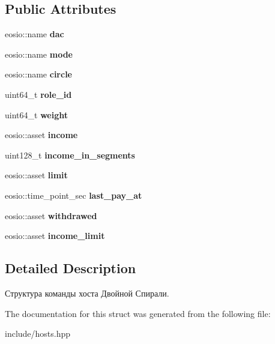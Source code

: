 \subsection*{Public Attributes}
\begin{DoxyCompactItemize}
\item 
\mbox{\label{structdacs_ae9be077b76903051cf3e9fbafe071bda}} 
eosio\+::name {\bfseries dac}
\item 
\mbox{\label{structdacs_a6b3d8acc4826f5b3d7c0ee75161490ac}} 
eosio\+::name {\bfseries mode}
\item 
\mbox{\label{structdacs_ab60ff845d44976364fa1c90a68fd8082}} 
eosio\+::name {\bfseries circle}
\item 
\mbox{\label{structdacs_ae88a910f895aae33d9cd222cbfa2888e}} 
uint64\+\_\+t {\bfseries role\+\_\+id}
\item 
\mbox{\label{structdacs_abd0b1806d25461cd48b36370bb6e7c09}} 
uint64\+\_\+t {\bfseries weight}
\item 
\mbox{\label{structdacs_a8127a0b285195817c1ddfed691d202cb}} 
eosio\+::asset {\bfseries income}
\item 
\mbox{\label{structdacs_a814ea7767e5b315cfc1f3328208e3aba}} 
uint128\+\_\+t {\bfseries income\+\_\+in\+\_\+segments}
\item 
\mbox{\label{structdacs_aeb6036192b4494082811b9e881d3bd92}} 
eosio\+::asset {\bfseries limit}
\item 
\mbox{\label{structdacs_abc7762bb445e20f54dc0d447cfc67bce}} 
eosio\+::time\+\_\+point\+\_\+sec {\bfseries last\+\_\+pay\+\_\+at}
\item 
\mbox{\label{structdacs_ad43317ebc8a377915fe01394f74164b8}} 
eosio\+::asset {\bfseries withdrawed}
\item 
\mbox{\label{structdacs_ac0ceba57e94b8f3e70e504d85f1f41cd}} 
eosio\+::asset {\bfseries income\+\_\+limit}
\end{DoxyCompactItemize}


\subsection{Detailed Description}
Структура команды хоста Двойной Спирали. 

The documentation for this struct was generated from the following file\+:\begin{DoxyCompactItemize}
\item 
include/hosts.\+hpp\end{DoxyCompactItemize}
